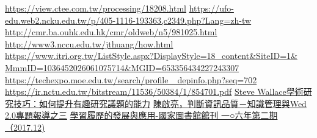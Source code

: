 \begin{thebibliography}{99}
\href{https://view.ctee.com.tw/processing/18208.html}{https://view.ctee.com.tw/processing/18208.html}
\href{https://ufo-edu.web2.ncku.edu.tw/p/405-1116-193363,c2349.php?Lang=zh-tw}{https://ufo-edu.web2.ncku.edu.tw/p/405-1116-193363,c2349.php?Lang=zh-tw}
\href{http://cmr.ba.ouhk.edu.hk/cmr/oldweb/n5/981025.html}{http://cmr.ba.ouhk.edu.hk/cmr/oldweb/n5/981025.html}
\href{http://www3.nccu.edu.tw/~jthuang/how.html}{http://www3.nccu.edu.tw/jthuang/how.html}
\href{https://www.itri.org.tw/ListStyle.aspx?DisplayStyle=18\_content\&SiteID=1\&MmmID=1036452026061075714\&MGID=653356434227243307}{https://www.itri.org.tw/ListStyle.aspx?DisplayStyle=18\_content\&SiteID=1\& MmmID=1036452026061075714\&MGID=653356434227243307}
\href{https://techexpo.moe.edu.tw/search/profile\_depinfo.php?seq=702}{https://techexpo.moe.edu.tw/search/profile\_ depinfo.php?seq=702}
\href{https://ir.nctu.edu.tw/bitstream/11536/50384/1/854701.pdf}{https://ir.nctu.edu.tw/bitstream/11536/50384/1/854701.pdf}
\href{Steve Wallace學術研究技巧：如何提升有趣研究議題的能力}{Steve Wallace學術研究技巧：如何提升有趣研究議題的能力}
\href{陳啟亮，判斷資訊品質－知識管理與Wed 2.0專題報導之三}{陳啟亮，判斷資訊品質－知識管理與Wed 2.0專題報導之三}
\href{學習履歷的發展與應用-國家圖書館館刊 一○六年第二期（2017.12)}{學習履歷的發展與應用-國家圖書館館刊 一○六年第二期（2017.12)}

\end{thebibliography}
\par